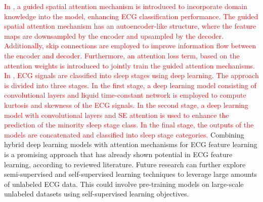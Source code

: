 \documentclass[preprint,12pt]{elsarticle}
\begin{document}
\textcolor{red}{In \citep{huang_ecg_2024}, a guided spatial attention mechanism is introduced to incorporate domain knowledge into the model, enhancing ECG classification performance. The guided spatial attention mechanism has an autoencoder-like structure, where the feature maps are downsampled by the encoder and upsampled by the decoder. Additionally, skip connections are employed to improve information flow between the encoder and decoder. Furthermore, an attention loss term, based on the attention weights is introduced to jointly train the guided attention mechanisms.} \textcolor{red}{In \citep{aghaomidi_ecg-sleepnet_2024}, ECG signals are classified into sleep stages using deep learning. The approach is divided into three stages. In the first stage, a deep learning model consisting of convolutional layers and liquid time-constant network \citep{hasani_liquid_2021} is employed to compute kurtosis and skewness of the ECG signals. In the second stage, a deep learning model with convolutional layers and SE attention is used to enhance the prediction of the minority sleep stage class. In the final stage, the outputs of the models are concatenated and classified into sleep stage categories.} Combining hybrid deep learning models with attention mechanisms for ECG feature learning is a promising approach that has already shown potential in ECG feature learning, according to reviewed literature. Future research can further explore semi-supervised and self-supervised learning techniques to leverage large amounts of unlabeled ECG data. This could involve pre-training models on large-scale unlabeled datasets using self-supervised learning objectives. 
\end{document}
